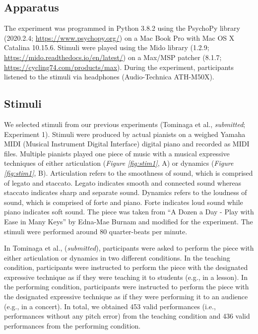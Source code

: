 \documentclass[
  man,floatsintext]{apa6}
\begin{document}
\hypertarget{apparatus}{%
\subsection{Apparatus}\label{apparatus}}

The experiment was programmed in Python 3.8.2 using the PsychoPy library (2020.2.4; \url{https://www.psychopy.org/}) on a Mac Book Pro with Mac OS X Catalina 10.15.6. Stimuli were played using the Mido library (1.2.9; \url{https://mido.readthedocs.io/en/latest/}) on a Max/MSP patcher (8.1.7; \url{https://cycling74.com/products/max}). During the experiment, participants listened to the stimuli via headphones (Audio-Technica ATH-M50X).

\hypertarget{stimuli}{%
\subsection{Stimuli}\label{stimuli}}

We selected stimuli from our previous experiments (Tominaga et al., \emph{submitted}; Experiment 1). Stimuli were produced by actual pianists on a weighed Yamaha MIDI (Musical Instrument Digital Interface) digital piano and recorded as MIDI files. Multiple pianists played one piece of music with a musical expressive techniques of either articulation (\emph{Figure \ref{fig:stim1}}, A) or dynamics (\emph{Figure \ref{fig:stim1}}, B). Articulation refers to the smoothness of sound, which is comprised of legato and staccato. Legato indicates smooth and connected sound whereas staccato indicates sharp and separate sound. Dynamics refers to the loudness of sound, which is comprised of forte and piano. Forte indicates loud sound while piano indicates soft sound. The piece was taken from ``A Dozen a Day - Play with Ease in Many Keys'' by Edna-Mae Burnam and modified for the experiment. The stimuli were performed around 80 quarter-beats per minute.

In Tominaga et al., (\emph{submitted}), participants were asked to perform the piece with either articulation or dynamics in two different conditions. In the teaching condition, participants were instructed to perform the piece with the designated expressive technique as if they were teaching it to students (e.g., in a lesson). In the performing condition, participants were instructed to perform the piece with the designated expressive technique as if they were performing it to an audience (e.g., in a concert). In total, we obtained 453 valid performances (i.e., performances without any pitch error) from the teaching condition and 436 valid performances from the performing condition.
\end{document}
